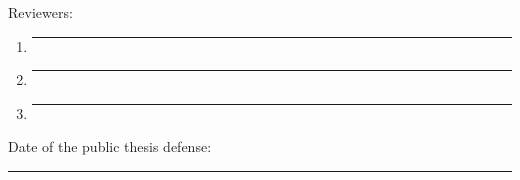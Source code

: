 \vspace*{15cm}
Reviewers: \\[0.5cm]
\begin{enumerate}
	\item \rule{10em}{0.5pt}
	\item \rule{10em}{0.5pt}
	\item \rule{10em}{0.5pt}
\end{enumerate} 
\vspace{1.0cm}
Date of the public thesis defense: \rule{8em}{0.5pt}
\newpage


